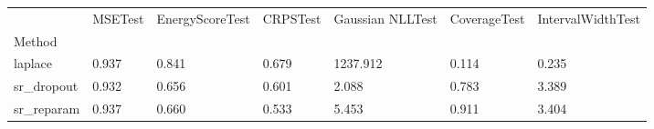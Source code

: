 \begin{tabular}{lllllll}
\toprule
 & MSETest & EnergyScoreTest & CRPSTest & Gaussian NLLTest & CoverageTest & IntervalWidthTest \\
Method &  &  &  &  &  &  \\
\midrule
laplace & 0.937 & 0.841 & 0.679 & 1237.912 & 0.114 & 0.235 \\
sr_dropout & 0.932 & 0.656 & 0.601 & 2.088 & 0.783 & 3.389 \\
sr_reparam & 0.937 & 0.660 & 0.533 & 5.453 & 0.911 & 3.404 \\
\bottomrule
\end{tabular}
